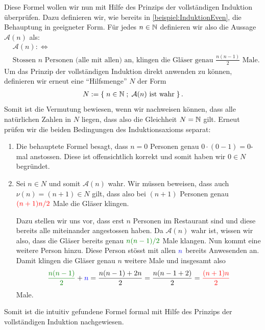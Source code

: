 {
Diese Formel wollen wir nun mit Hilfe des Prinzips der vollständigen Induktion überprüfen. Dazu definieren wir, wie bereits in \cref{beispiel:InduktionEven}, die Behauptung in geeigneter Form. Für jedes $n\in\mathbb{N}$ definieren wir also die Aussage $\mathcal{A}(n)$ als:
\begin{align*}
    &\mathcal{A}(n) :\iff \\
    &\text{Stossen $n$ Personen (alle mit allen) an, klingen die Gläser genau } \frac{n(n-1)}{2}\text{ Male}.
\end{align*}
Um das Prinzip der vollständigen Induktion direkt anwenden zu können, definieren wir erneut eine \enquote{Hilfsmenge} $N$ der Form
\begin{align*}
    N := \left\{\;n\in\mathbb{N} \; ; \; \text{$\mathcal{A}(n)$ ist wahr} \;\right\}.
\end{align*}
Somit ist die Vermutung bewiesen, wenn wir nachweisen können, dass alle natürlichen Zahlen in $N$ liegen, dass also die Gleichheit $N=\mathbb{N}$ gilt. Erneut prüfen wir die beiden Bedingungen des Induktionsaxioms separat:
\begin{enumerate}
    \item Die behauptete Formel besagt, dass $n = 0$ Personen genau $0\cdot (0-1) = 0$-mal anstossen. Diese ist offensichtlich korrekt und somit haben wir $0\in N$ begründet. \checkmark
    \item Sei $n\in N$ und somit $\mathcal{A}(n)$ wahr. Wir müssen beweisen, dass auch $\nu(n)=(n+1)\in N$ gilt, dass also bei $(n+1)$ Personen genau $\textcolor{Red}{(n+1)n/2}$ Male die Gläser klingen. 
    
    \noindent
    Dazu stellen wir uns vor, dass erst $n$ Personen im Restaurant sind und diese bereits alle miteinander angestossen haben. Da $\mathcal{A}(n)$ wahr ist, wissen wir also, dass die Gläser bereits genau $\textcolor{Green}{n(n-1)/2}$ Male klangen. Nun kommt eine weitere Person hinzu. Diese Person stösst mit allen $\textcolor{Blue}{n}$ bereits Anwesenden an. Damit klingen die Gläser genau $n$ weitere Male und insgesamt also
    \begin{align*}
        \textcolor{Green}{\frac{n(n-1)}{2}} + \textcolor{Blue}{n} = \frac{n(n-1)+2n}{2} = \frac{n(n-1+2)}{2} = \textcolor{Red}{\frac{(n+1)n}{2}}
    \end{align*}
    Male. \checkmark
\end{enumerate}
Somit ist die intuitiv gefundene Formel formal mit Hilfe des Prinzips der vollständigen Induktion nachgewiesen.}

